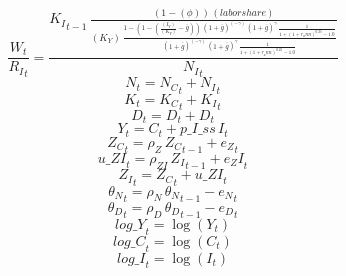 \begin{dmath}
\frac{{{W}}_{t}}{{{R_I}}_{t}}=\frac{{{K_I}}_{t-1}\, \frac{\left(1-{(\phi)}\right)\, {(labor share)}}{{(K_Y)}\, \frac{1-\left(1-\left(\frac{{(I_Y)}}{{(K_Y)}}-{{\overline{g}}}\right)\right)\, \left(1+{{\overline{g}}}\right)^{\left(-{{\gamma}}\right)}\, \left(1+{{\overline{g}}}\right)^{{{\gamma}}}\, \frac{1}{1+\left(1+{{r_ann}}\right)^{0.25}-1.0}}{\left(1+{{\overline{g}}}\right)^{\left(-{{\gamma}}\right)}\, \left(1+{{\overline{g}}}\right)^{{{\gamma}}}\, \frac{1}{1+\left(1+{{r_ann}}\right)^{0.25}-1.0}}}}{{{N_I}}_{t}}
\end{dmath}
\begin{dmath}
{{N}}_{t}={{N_C}}_{t}+{{N_I}}_{t}
\end{dmath}
\begin{dmath}
{{K}}_{t}={{K_C}}_{t}+{{K_I}}_{t}
\end{dmath}
\begin{dmath}
{{D}}_{t}={{D}}_{t}+{{D}}_{t}
\end{dmath}
\begin{dmath}
{{Y}}_{t}={{C}}_{t}+{p\_I\_ss}\, {{I}}_{t}
\end{dmath}
\begin{dmath}
{{Z_C}}_{t}={{\rho_Z}}\, {{Z_C}}_{t-1}+{{e_Z}}_{t}
\end{dmath}
\begin{dmath}
{u\_ZI}_{t}={{\rho_{ZI}}}\, {{Z_I}}_{t-1}+{{e_ZI}}_{t}
\end{dmath}
\begin{dmath}
{{Z_I}}_{t}={{Z_C}}_{t}+{u\_ZI}_{t}
\end{dmath}
\begin{dmath}
{{\theta_N}}_{t}={{\rho_N}}\, {{\theta_N}}_{t-1}-{{e_N}}_{t}
\end{dmath}
\begin{dmath}
{{\theta_D}}_{t}={{\rho_D}}\, {{\theta_D}}_{t-1}-{{e_D}}_{t}
\end{dmath}
\begin{dmath}
{log\_Y}_{t}=\log\left({{Y}}_{t}\right)
\end{dmath}
\begin{dmath}
{log\_C}_{t}=\log\left({{C}}_{t}\right)
\end{dmath}
\begin{dmath}
{log\_I}_{t}=\log\left({{I}}_{t}\right)
\end{dmath}

